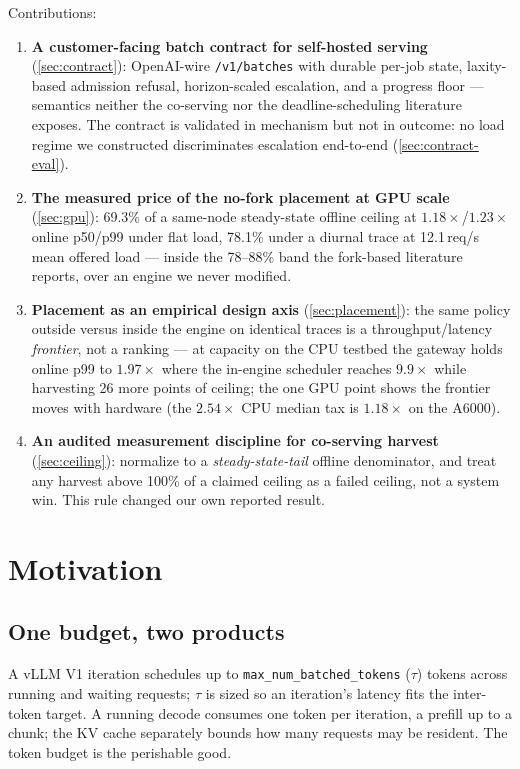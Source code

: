 \documentclass[conference]{IEEEtran}
\newcommand{\code}[1]{\texttt{#1}}
\begin{document}
\smallskip
\noindent Contributions:
\begin{enumerate}\itemsep2pt
  \item \textbf{A customer-facing batch contract for self-hosted serving}
    (\cref{sec:contract}): OpenAI-wire \code{/v1/batches} with durable per-job state,
    laxity-based admission refusal, horizon-scaled escalation, and a progress floor ---
    semantics neither the co-serving nor the deadline-scheduling literature exposes.
    The contract is validated in mechanism but not in outcome: no load regime we
    constructed discriminates escalation end-to-end (\cref{sec:contract-eval}).
  \item \textbf{The measured price of the no-fork placement at GPU scale}
    (\cref{sec:gpu}): 69.3\% of a same-node steady-state offline ceiling at
    $1.18\times$/$1.23\times$ online p50/p99 under flat load, 78.1\% under a diurnal
    trace at 12.1\,req/s mean offered load --- inside the 78--88\% band the fork-based
    literature reports, over an engine we never modified.
  \item \textbf{Placement as an empirical design axis} (\cref{sec:placement}): the same
    policy outside versus inside the engine on identical traces is a throughput/latency
    \emph{frontier}, not a ranking --- at capacity on the CPU testbed the gateway holds
    online p99 to $1.97\times$ where the in-engine scheduler reaches $9.9\times$ while
    harvesting 26 more points of ceiling; the one GPU point shows the frontier moves with hardware (the
    $2.54\times$ CPU median tax is $1.18\times$ on the A6000).
  \item \textbf{An audited measurement discipline for co-serving harvest}
    (\cref{sec:ceiling}): normalize to a \emph{steady-state-tail} offline denominator,
    and treat any harvest above 100\% of a claimed ceiling as a failed ceiling, not a
    system win. This rule changed our own reported result.
\end{enumerate}

\section{Motivation}
\label{sec:motivation}

\subsection{One budget, two products}
\label{sec:budget}

A vLLM V1 iteration schedules up to \code{max\_num\_\discretionary{}{}{}batched\_tokens} ($\tau$) tokens
across running and waiting requests; $\tau$ is sized so an iteration's latency fits the
inter-token target. A running decode consumes one token per iteration, a prefill up to a
chunk; the KV cache separately bounds how many requests may be resident. The token budget
is the perishable good.
\end{document}
